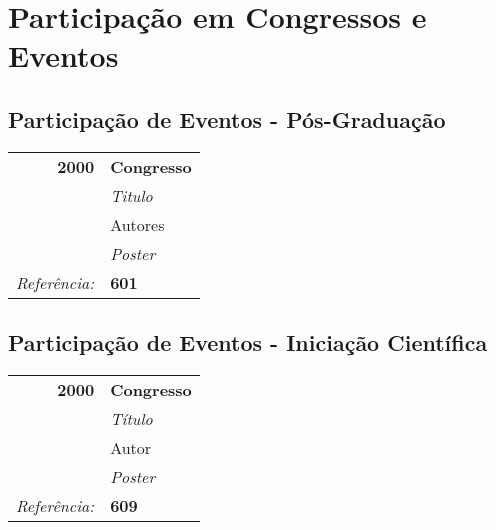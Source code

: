 \chapter{Participação em Congressos e Eventos}

\section{Participação de Eventos - Pós-Graduação}
\begin{center}
\begin{tabular}[t]{rl}
\textbf{2000} &\textbf{Congresso} \\
              & \textit{Titulo}\\
              &  Autores\\
              & \textit{Poster}\\
\textit{Referência:} & \textbf{601} \\

\end{tabular}
\end{center}


\section{Participação de Eventos - Iniciação Científica}
\begin{center}
\begin{tabular}[t]{rl}

\textbf{2000} &\textbf{Congresso} \\
              & \textit{Título}\\
              & Autor\\
              & \textit{Poster}\\
\textit{Referência:} & \textbf{609} \\

\end{tabular}
\end{center}